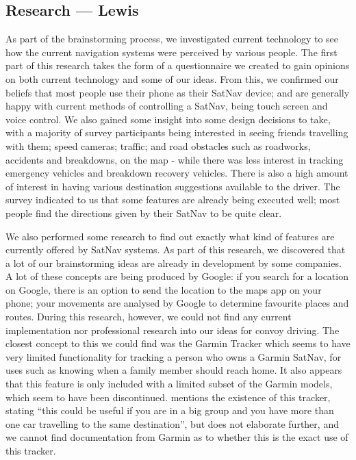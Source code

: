 \documentclass{article}
\begin{document}
\subsection{Research --- Lewis}\label{ssec:nav-research}
As part of the brainstorming process, we investigated current technology to see how the current navigation systems were perceived by various people. The first part of this research takes the form of a questionnaire we created to gain opinions on both current technology and some of our ideas. From this, we confirmed our beliefs that most people use their phone as their SatNav device; and are generally happy with current methods of controlling a SatNav, being touch screen and voice control. We also gained some insight into some design decisions to take, with a majority of survey participants being interested in seeing friends travelling with them; speed cameras; traffic; and road obstacles such as roadworks, accidents and breakdowns, on the map - while there was less interest in tracking emergency vehicles and breakdown recovery vehicles. There is also a high amount of interest in having various destination suggestions available to the driver. The survey  indicated to us that some features are already being executed well; most people find the directions given by their SatNav to be quite clear.

We also performed some research to find out exactly what kind of features are currently offered by SatNav systems. As part of this research, we discovered that a lot of our brainstorming ideas are already in development by some companies. A lot of these concepts are being produced by Google: if you search for a location on Google, there is an option to send the location to the maps app on your phone; your movements are analysed by Google to determine favourite places and routes.
During this research, however, we could not find any current implementation nor professional research into our ideas for convoy driving. The closest concept to this we could find was the Garmin Tracker
which seems to have very limited functionality for tracking a person who owns a Garmin SatNav, for uses such as knowing when a family member should reach home. It also appears that this feature is only included with a limited subset of the Garmin models, which seem to have been discontinued. \cite{RefWorks:2} 
mentions the existence of this tracker, stating ``this could be useful if you are in a big group and you have more than one car travelling to the same destination'', but does not elaborate further, and we cannot find documentation from Garmin as to whether this is the exact use of this tracker.
\end{document}
